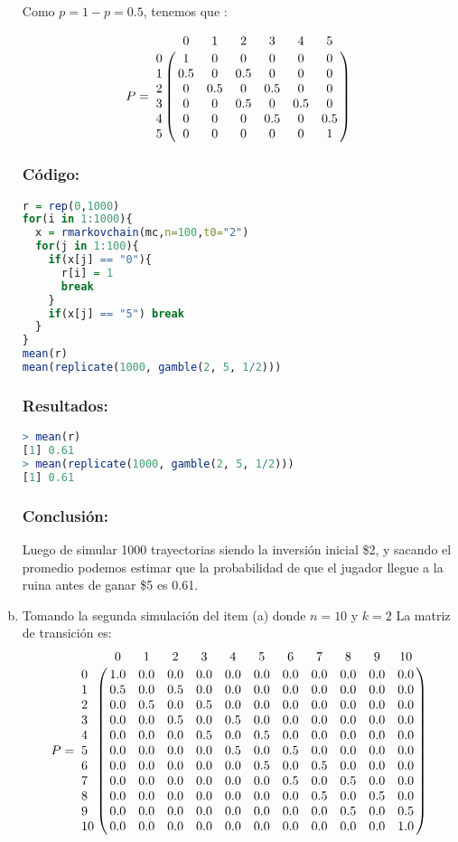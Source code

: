 \documentclass{article}
\begin{document}
\begin{enumerate}[(a)]
Como $ p = 1 - p = 0.5$, tenemos que :

$$
P = 
\bordermatrix{ 
\text{} & 0 & 1 & 2 & 3 & 4 & 5\cr
0&1&0&0&0&0&0 \cr
1&0.5&0&0.5&0&0&0 \cr
2&0&0.5&0&0.5&0&0 \cr
3&0&0&0.5&0&0.5&0 \cr
4&0&0&0&0.5&0&0.5 \cr
5&0&0&0&0&0&1
}
$$

\subsubsection*{Código:}
\begin{lstlisting}[language=R]
r = rep(0,1000)
for(i in 1:1000){
  x = rmarkovchain(mc,n=100,t0="2")
  for(j in 1:100){
    if(x[j] == "0"){
      r[i] = 1
      break  
    } 
    if(x[j] == "5") break
  }
}
mean(r)
mean(replicate(1000, gamble(2, 5, 1/2)))
\end{lstlisting}

\subsubsection*{Resultados:}
\begin{lstlisting}[language=R]
> mean(r)
[1] 0.61
> mean(replicate(1000, gamble(2, 5, 1/2)))
[1] 0.61
\end{lstlisting}

\subsubsection*{Conclusión:}
Luego de simular 1000 trayectorias siendo la inversión inicial \$2, y sacando el promedio podemos estimar que la probabilidad de que el jugador llegue a la ruina antes de ganar \$5 es 0.61.




\item Tomando la segunda simulación del item (a) donde $n = 10$ y $k = 2$ La matriz de transición es:
$$
P = 
\bordermatrix{ 
\text{}       &0 &1 &2 &3 &4 &5 &6 &7 &8 &9 &10 \cr
 0  &1.0  &0.0  &0.0  &0.0  &0.0  &0.0  &0.0  &0.0  &0.0   &0.0   &0.0 \cr
 1  &0.5  &0.0  &0.5  &0.0  &0.0  &0.0  &0.0  &0.0  &0.0   &0.0   &0.0 \cr
 2  &0.0  &0.5  &0.0  &0.5  &0.0  &0.0  &0.0  &0.0  &0.0   &0.0   &0.0 \cr
 3  &0.0  &0.0  &0.5  &0.0  &0.5  &0.0  &0.0  &0.0  &0.0   &0.0   &0.0 \cr
 4  &0.0  &0.0  &0.0  &0.5  &0.0  &0.5  &0.0  &0.0  &0.0   &0.0   &0.0 \cr
 5  &0.0  &0.0  &0.0  &0.0  &0.5  &0.0  &0.5  &0.0  &0.0   &0.0   &0.0 \cr
 6  &0.0  &0.0  &0.0  &0.0  &0.0  &0.5  &0.0  &0.5  &0.0   &0.0   &0.0 \cr
 7  &0.0  &0.0  &0.0  &0.0  &0.0  &0.0  &0.5  &0.0  &0.5   &0.0   &0.0 \cr
 8  &0.0  &0.0  &0.0  &0.0  &0.0  &0.0  &0.0  &0.5  &0.0   &0.5   &0.0 \cr
9  &0.0  &0.0  &0.0  &0.0  &0.0  &0.0  &0.0  &0.0  &0.5   &0.0   &0.5 \cr
10  &0.0  &0.0  &0.0  &0.0  &0.0  &0.0  &0.0  &0.0  &0.0   &0.0   &1.0
}
$$ 

\end{enumerate}
\end{document}
